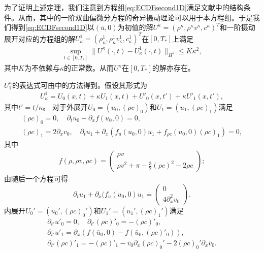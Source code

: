 为了证明上述定理，我们注意到方程组\eqref{eq:ECDFsecond1D}满足文献\cite{yong1992singular,yong1999singular}中的结构条件。从而，其中的一阶双曲偏微分方程的奇异摄动理论可以用于本方程组。于是我们得到\eqref{eq:ECDFsecond1D}以$(\bar{u},0)$为初值的解$U^\kappa = (\rho^\kappa, \rho^\kappa v^\kappa, c^\kappa)^T$和一阶摄动展开对应的方程组的解$U_\kappa^1=(\rho_\kappa^1,\rho_\kappa^1 v_\kappa^1, c^1_\kappa)^T$在$[0,T_*]$上满足
\begin{eqnarray}\label{53}
  \sup_{t \in [0, T_*]} \|U^\kappa(\cdot, t) - U_\kappa^1(\cdot, t)\|_{H^s} \le K\kappa^2,
\end{eqnarray}
其中$K$为不依赖与$\kappa$的正常数。从而$U^\kappa$在$[0,T_*]$的解亦存在。

$U^\kappa_1$的表达式可由\cite{yong1992singular,yong1999singular}中的方法得到。假设其形式为
\begin{eqnarray*}
U^1_\kappa  = U_0(x,t) + \kappa U_1(x,t) + U'_0(x,t') + \kappa U'_1(x,t'),
\end{eqnarray*}
其中$t'=t/\kappa$。
对于外展开$U_0=(u_0, (\rho c)_0)$和$U_1=(u_1, (\rho c)_1)$满足
\begin{eqnarray}
 (\rho c)_0 = 0, \quad
  \partial_t u_0+ \partial_x f(u_0,0)=0 , \nonumber \\
  (\rho c)_1 = 2\partial_x v_0, \quad
  \partial_t u_1 + \partial_x (f_u(u_0,0) u_1 + f_{\rho c}(u_0,0)(\rho c)_1)  = 0 \label{54},
	\end{eqnarray}
其中
\begin{eqnarray*}
  f(\rho,\rho v,\rho c) = \left( \begin{array}{cc} \rho v \\ \rho v^2 + \pi - \frac{3}{2} (\rho c)^2 - 2\rho c \end{array} \right);
\end{eqnarray*}
由随后一个方程可得
\begin{equation*}
	  \partial_t u_1 + \partial_x (f_u(u_0,0) u_1   = \left( \begin{matrix}
	  		0 \\ 4 \partial_x^2 v_0
	  \end{matrix} \right).
\end{equation*}
内展开$U_0'=(u_0', (\rho c)_0')$和$U_1'=(u_1', (\rho c)_1')$满足
\begin{eqnarray*}
 \partial_{t'} u'_0 = 0,  \quad \partial_{t'} (\rho c)'_0 = -(\rho c)'_0 , \\
  \partial_{t'} u'_1 = \partial_x(f(\bar u_0,0) - f(\bar u_0,(\rho c)'_0)), \\
  \partial_{t'} (\rho c)'_1 = - (\rho c)'_1 - \bar v_0 \partial_x (\rho c)_0' -2 (\rho c)_0'\partial_x \bar v_0.
\end{eqnarray*}
